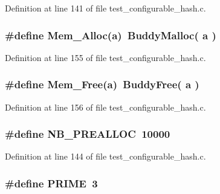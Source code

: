 Definition at line 141 of file test\_\-configurable\_\-hash.c.
\subsubsection[{Mem\_\-Alloc}]{\setlength{\rightskip}{0pt plus 5cm}\#define Mem\_\-Alloc(a)~BuddyMalloc( a )}\label{test__configurable__hash_8c_d6b7282e7c215186f8514097b04d5bfa}




Definition at line 155 of file test\_\-configurable\_\-hash.c.
\subsubsection[{Mem\_\-Free}]{\setlength{\rightskip}{0pt plus 5cm}\#define Mem\_\-Free(a)~BuddyFree( a )}\label{test__configurable__hash_8c_4e6d06ceac8fce7d7b9dde85e225ad4a}




Definition at line 156 of file test\_\-configurable\_\-hash.c.
\subsubsection[{NB\_\-PREALLOC}]{\setlength{\rightskip}{0pt plus 5cm}\#define NB\_\-PREALLOC~10000}\label{test__configurable__hash_8c_86ddf7c36b9a7e599bb04786c61b0370}




Definition at line 144 of file test\_\-configurable\_\-hash.c.
\subsubsection[{PRIME}]{\setlength{\rightskip}{0pt plus 5cm}\#define PRIME~3}\label{test__configurable__hash_8c_c4add2a227a10511e0128d63952030e8}




